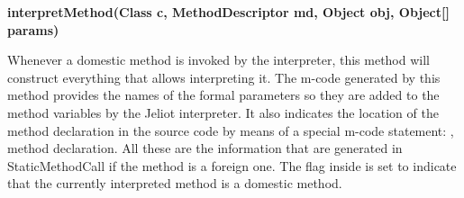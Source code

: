 {\bf{interpretMethod(Class c, MethodDescriptor md, Object obj, Object[] params)}}

Whenever a domestic method is invoked by the interpreter, this method will
construct everything that allows interpreting it. The m-code generated by
this method provides the names of the formal parameters so they are added
to the method variables by the Jeliot interpreter. It also indicates the
location of the method declaration in the source code by means of a special
m-code statement: , method declaration. All these are the information
that are generated in StaticMethodCall if the method is a foreign one.
The flag inside is set to indicate that the currently interpreted method
is a domestic method.
